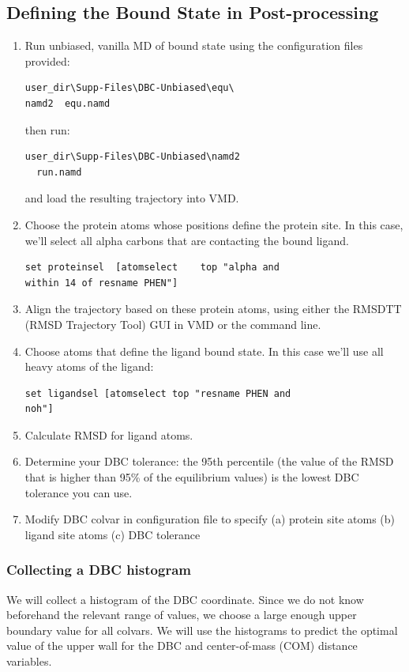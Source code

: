 \documentclass[9pt,tutorial]{livecoms}
\begin{document}
\subsection{Defining the Bound State in Post-processing}
\label{section 6.3}
\begin{enumerate}
\item Run unbiased, vanilla MD of bound state using the configuration files provided:
\begin{verbatim}
user_dir\Supp-Files\DBC-Unbiased\equ\
namd2  equ.namd
\end{verbatim}
then run:
\begin{verbatim}
user_dir\Supp-Files\DBC-Unbiased\namd2
  run.namd
\end{verbatim}
and load the resulting trajectory into VMD. 
\item Choose the protein atoms whose positions define the protein site. In this case, we'll select all alpha carbons that are contacting the bound ligand.   
 \begin{verbatim}
set proteinsel  [atomselect    top "alpha and 
within 14 of resname PHEN"] 
\end{verbatim}
\item Align the trajectory based on these protein atoms, using either the RMSDTT (RMSD Trajectory Tool) GUI in VMD or the command line. 
\item Choose atoms that define the ligand bound state. In this case we'll use all heavy atoms of the ligand: 
\begin{verbatim}
set ligandsel [atomselect top "resname PHEN and
noh"]
\end{verbatim}
\item Calculate RMSD for ligand atoms.
\item Determine your DBC tolerance: the 95th percentile (the value of the RMSD that is higher than 95\% of the equilibrium values) is the lowest DBC tolerance you can use.    
\item Modify DBC colvar in configuration file to specify (a) protein site atoms (b) ligand site atoms (c) DBC tolerance
\end{enumerate}
\subsubsection{Collecting a DBC histogram}\label{section 6.3.1}

We will collect a histogram of the DBC coordinate.
Since we do not know beforehand the relevant range of values, we choose a large enough upper boundary value for all colvars.
We will use the histograms to predict the optimal value of the upper wall for the DBC and center-of-mass (COM) distance variables.
\end{document}
